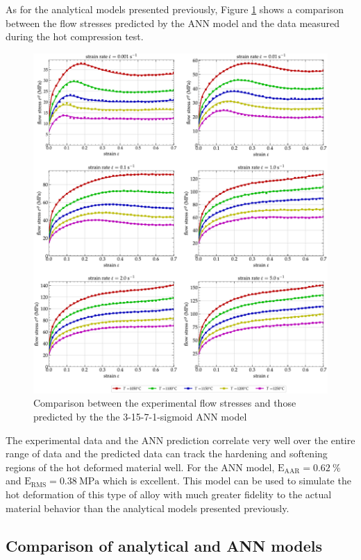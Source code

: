 \documentclass[twoside,english,1p,final,sort&compress]{elsarticle}
\theoremstyle{plain}
\DeclareRobustCommand{\RMSE}{\text{E}_\text{RMS}}
\DeclareRobustCommand{\AARE}{\text{E}_\text{AAR}}
\DeclareRobustCommand{\MPa}{\text{MPa}}
\begin{document}
As for the analytical models presented previously, Figure \ref{fig:CompExp-3-15-7-1-sigmoid} shows a comparison between the flow stresses predicted by the ANN model and the data measured during the hot compression test.
\begin{figure}[!ht]
\centering
\includegraphics[width=\columnwidth]
{Figures/CompExp-3-15-7-1-sigmoid}
\caption{Comparison between the experimental flow stresses and those predicted by the the 3-15-7-1-sigmoid ANN model}
\label{fig:CompExp-3-15-7-1-sigmoid}
\end{figure}
The experimental data and the ANN prediction correlate very well over the entire range of data and the predicted data can track the hardening and softening regions of the hot deformed material well.
For the ANN model, $\AARE=0.62~\%$ and $\RMSE=0.38~\MPa$ which is excellent.
This model can be used to simulate the hot deformation of this type of alloy with much greater fidelity to the actual material behavior than the analytical models presented previously.

\subsection{Comparison of analytical and ANN models\label{sec:Comparison}}
\end{document}
